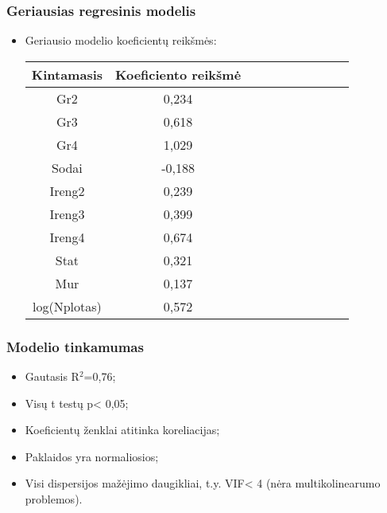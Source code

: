 \documentclass[utf8,hyperref={unicode}]{beamer}
\theoremstyle{change}\newtheorem{teorema}{Teiginys}
\theoremstyle{change}\newtheorem{salyga}{}
\begin{document}
\begin{frame}
   \frametitle{Geriausias regresinis modelis}
\begin{itemize}
         \item Geriausio modelio koeficientų reikšmės:
\begin{table}
\begin{tabular}{|c|c|c|c|c|c|c|c|c|c|}
  \hline
\textbf{Kintamasis} & \textbf{Koeficiento reikšmė}\\ \hline
{Gr2} & 0,234\\ \hline
{Gr3}& 0,618\\ \hline
{Gr4}& 1,029\\ \hline
{Sodai}& -0,188\\ \hline
{Ireng2}& 0,239\\ \hline
{Ireng3}& 0,399\\ \hline
{Ireng4}& 0,674\\ \hline
{Stat}& 0,321\\ \hline
{Mur}&0,137\\ \hline
{log(Nplotas)}& 0,572\\ \hline
\end{tabular}
\end{table}
\end{itemize}
\end{frame}

\begin{frame}
 \frametitle{Modelio tinkamumas}
\begin{itemize}
           \item Gautasis R$^2$=0,76;
          \item Visų t testų p< 0,05;
          \item Koeficientų ženklai atitinka koreliacijas;
         \item Paklaidos yra normaliosios;
         \item Visi dispersijos mažėjimo daugikliai, t.y. VIF< 4 (nėra multikolinearumo problemos).
    \end{itemize}
 \end{frame}
\end{document}
